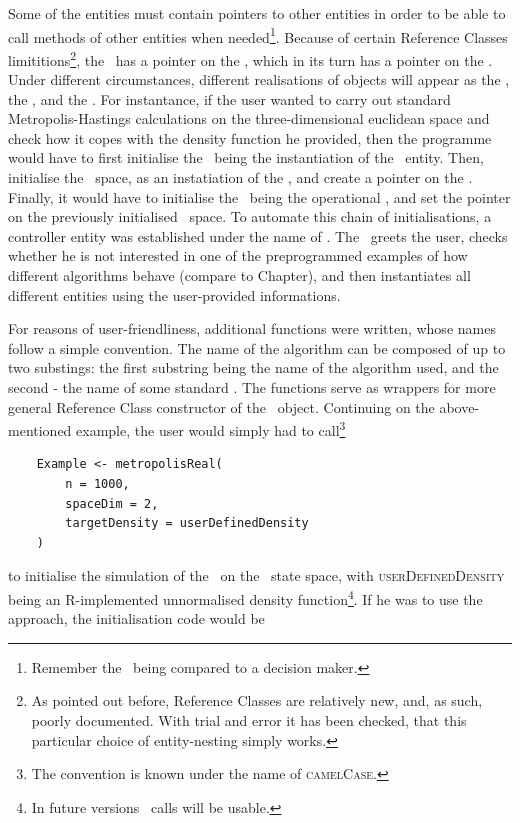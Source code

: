 Some of the entities must contain pointers to other entities in order to be able to call methods of other entities when needed\footnote{Remember the \algo\, being compared to a decision maker.}. Because of certain Reference Classes limititions\footnote{As pointed out before, Reference Classes are relatively new, and, as such, poorly documented. With trial and error it has been checked, that this particular choice of entity-nesting simply works.}, the \algo\, has a pointer on the \sspace, which in its turn has a pointer on the \measure. Under different circumstances, different realisations of objects will appear as the \algo, the \sspace, and the \measure. For instantance, if the user wanted to carry out standard Metropolis-Hastings calculations on the three-dimensional euclidean space and check how it copes with the density function he provided, then the programme would have to first  initialise the \udensity\, being the instantiation of the \measure\, entity. Then, initialise the \rspace\, space, as an instatiation of the \sspace, and create a pointer on the \udensity. Finally, it would have to initialise the \MH\, being the operational \algo, and set the pointer on the previously initialised \rspace\, space. To automate this chain of initialisations, a controller entity was established under the name of \simulation. The \simulation\, greets the user, checks whether he is not interested in one of the preprogrammed examples of how different algorithms behave (compare to Chapter), and then instantiates all different entities using the user-provided informations. 

For reasons of user-friendliness, additional functions were written, whose names follow a simple convention. The name of the algorithm can be composed of up to two substings: the first substring being the name of the algorithm used, and the second - the name of some standard \sspace. The functions serve as wrappers for more general Reference Class constructor of the \simulation\, object. Continuing on the above-mentioned example, the user would simply had to call\footnote{The convention is known under the name of \textsc{camelCase}.}

\begin{lstlisting}
	Example <- metropolisReal(
		n = 1000,
		spaceDim = 2,
		targetDensity = userDefinedDensity
	)
\end{lstlisting}  
to initialise the simulation of the \MHalgo\, on the \rspace\, state space, with \textsc{userDefinedDensity} being an R-implemented unnormalised density function\footnote{In future versions \Cpp\, calls will be usable.}. If he was to use the \PTalgo\, approach, the initialisation code would be 

